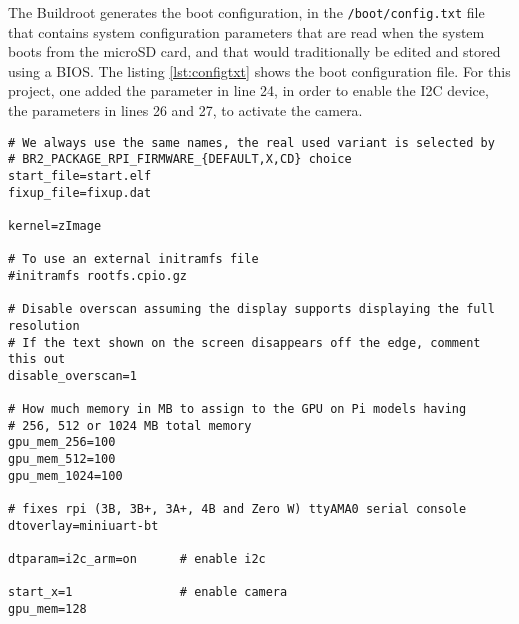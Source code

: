 The Buildroot generates the boot configuration, in the \verb|/boot/config.txt| file that contains system configuration parameters that are read when the system boots from the microSD card, and that would traditionally be edited and stored using a BIOS. The listing \ref{lst:configtxt} shows the boot configuration file. For this project, one added the parameter in line 24, in order to enable the I2C device, the parameters in lines 26 and 27, to activate the camera.

\begin{lstlisting}[caption={/boot/config.txt file.}, label={lst:configtxt}]
# We always use the same names, the real used variant is selected by
# BR2_PACKAGE_RPI_FIRMWARE_{DEFAULT,X,CD} choice
start_file=start.elf
fixup_file=fixup.dat

kernel=zImage

# To use an external initramfs file
#initramfs rootfs.cpio.gz

# Disable overscan assuming the display supports displaying the full resolution
# If the text shown on the screen disappears off the edge, comment this out
disable_overscan=1

# How much memory in MB to assign to the GPU on Pi models having
# 256, 512 or 1024 MB total memory
gpu_mem_256=100
gpu_mem_512=100
gpu_mem_1024=100

# fixes rpi (3B, 3B+, 3A+, 4B and Zero W) ttyAMA0 serial console
dtoverlay=miniuart-bt

dtparam=i2c_arm=on 		# enable i2c

start_x=1             	# enable camera
gpu_mem=128           
\end{lstlisting}